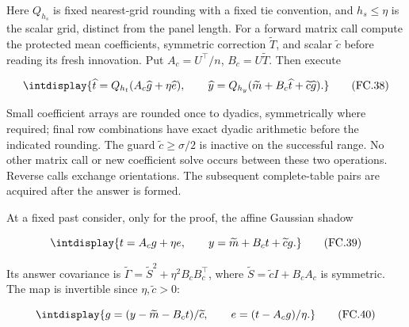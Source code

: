 
Here \(Q_{h_s}\) is fixed nearest-grid rounding with a fixed tie convention, and \(h_s\le\eta\) is the scalar grid, distinct from the panel length. For a forward matrix call compute the protected mean coefficients, symmetric correction \(\widetilde T\), and scalar \(\widetilde c\) before reading its fresh innovation. Put \(A_c=U^\top/n\), \(B_c=U\widetilde T\). Then execute


\begingroup\renewcommand{\theHequation}{intdisplay.740}
\begin{equation}
\intdisplay{
\widehat t=Q_{h_t}(A_c\widehat g+\eta\widehat e),\qquad
\widehat y=Q_{h_y}(\widetilde m+B_c\widehat t+
\widetilde c\widehat g).
}
\tag{FC.38}
\label{int:eq-0343-fc-38}
\end{equation}
\endgroup


Small coefficient arrays are rounded once to dyadics, symmetrically where required; final row combinations have exact dyadic arithmetic before the indicated rounding. The guard \(\widetilde c\ge\sigma/2\) is inactive on the successful range. No other matrix call or new coefficient solve occurs between these two operations. Reverse calls exchange orientations. The subsequent complete-table pairs are acquired after the answer is formed.



At a fixed past consider, only for the proof, the affine Gaussian shadow


\begingroup\renewcommand{\theHequation}{intdisplay.741}
\begin{equation}
\intdisplay{
t=A_cg+\eta e,\qquad y=\widetilde m+B_ct+\widetilde c g.
}
\tag{FC.39}
\label{int:eq-0344-fc-39}
\end{equation}
\endgroup


Its answer covariance is \(\widetilde\Gamma=\widetilde S^2+\eta^2B_cB_c^\top\), where \(\widetilde S=\widetilde cI+B_cA_c\) is symmetric. The map is invertible since \(\eta,\allowbreak \widetilde c>0\):


\begingroup\renewcommand{\theHequation}{intdisplay.742}
\begin{equation}
\intdisplay{
g=(y-\widetilde m-B_ct)/\widetilde c,\qquad
e=(t-A_cg)/\eta.
}
\tag{FC.40}
\label{int:eq-0345-fc-40}
\end{equation}
\endgroup

